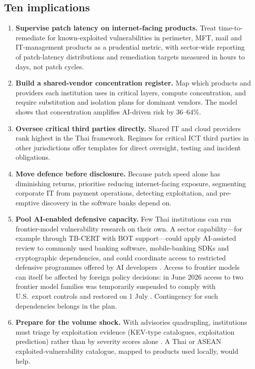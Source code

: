 \subsection{Ten implications}
\begin{enumerate}[leftmargin=1.6em]
\item \textbf{Supervise patch latency on internet-facing products.} Treat time-to-remediate for known-exploited vulnerabilities in perimeter, MFT, mail and IT-management products as a prudential metric, with sector-wide reporting of patch-latency distributions and remediation targets measured in hours to days, not patch cycles.
\item \textbf{Build a shared-vendor concentration register.} Map which products and providers each institution uses in critical layers, compute concentration, and require substitution and isolation plans for dominant vendors. The model shows that concentration amplifies AI-driven risk by 36--64\%.
\item \textbf{Oversee critical third parties directly.} Shared IT and cloud providers rank highest in the Thai framework. Regimes for critical ICT third parties in other jurisdictions \citep{eu2022dora,boe2024ctp} offer templates for direct oversight, testing and incident obligations.
\item \textbf{Move defence before disclosure.} Because patch speed alone has diminishing returns, prioritise reducing internet-facing exposure, segmenting corporate IT from payment operations, detecting exploitation, and pre-emptive discovery in the software banks depend on.
\item \textbf{Pool AI-enabled defensive capacity.} Few Thai institutions can run frontier-model vulnerability research on their own. A sector capability---for example through TB-CERT with BOT support---could apply AI-assisted review to commonly used banking software, mobile-banking SDKs and cryptographic dependencies, and could coordinate access to restricted defensive programmes offered by AI developers \citep{anthropic2026glasswing}. Access to frontier models can itself be affected by foreign policy decisions: in June 2026 access to two frontier model families was temporarily suspended to comply with U.S.\ export controls and restored on 1 July \citep{anthropic2026access}. Contingency for such dependencies belongs in the plan.
\item \textbf{Prepare for the volume shock.} With advisories quadrupling, institutions must triage by exploitation evidence (KEV-type catalogues, exploitation prediction) rather than by severity scores alone \citep{jacobs2021epss}. A Thai or ASEAN exploited-vulnerability catalogue, mapped to products used locally, would help.

\end{enumerate}
